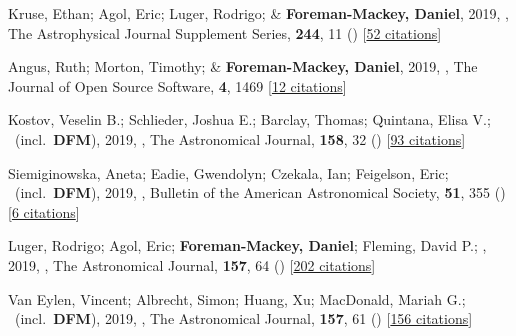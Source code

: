\item[{\color{numcolor}\scriptsize46}] Kruse, Ethan; Agol, Eric; Luger, Rodrigo; \& \textbf{Foreman-Mackey, Daniel}, 2019, , The Astrophysical Journal Supplement Series, \textbf{244}, 11 () [\href{https://ui.adsabs.harvard.edu/abs/2019ApJS..244...11K}{52 citations}]

\item[{\color{numcolor}\scriptsize45}] Angus, Ruth; Morton, Timothy; \& \textbf{Foreman-Mackey, Daniel}, 2019, , The Journal of Open Source Software, \textbf{4}, 1469 [\href{https://ui.adsabs.harvard.edu/abs/2019JOSS....4.1469A}{12 citations}]

\item[{\color{numcolor}\scriptsize44}] Kostov, Veselin B.; Schlieder, Joshua E.; Barclay, Thomas; Quintana, Elisa V.; \etal\ (incl.\ \textbf{DFM}), 2019, , The Astronomical Journal, \textbf{158}, 32 () [\href{https://ui.adsabs.harvard.edu/abs/2019AJ....158...32K}{93 citations}]

\item[{\color{numcolor}\scriptsize43}] Siemiginowska, Aneta; Eadie, Gwendolyn; Czekala, Ian; Feigelson, Eric; \etal\ (incl.\ \textbf{DFM}), 2019, , Bulletin of the American Astronomical Society, \textbf{51}, 355 () [\href{https://ui.adsabs.harvard.edu/abs/2019BAAS...51c.355S}{6 citations}]

\item[{\color{numcolor}\scriptsize42}] Luger, Rodrigo; Agol, Eric; \textbf{Foreman-Mackey, Daniel}; Fleming, David P.; \etal, 2019, , The Astronomical Journal, \textbf{157}, 64 () [\href{https://ui.adsabs.harvard.edu/abs/2019AJ....157...64L}{202 citations}]

\item[{\color{numcolor}\scriptsize41}] Van Eylen, Vincent; Albrecht, Simon; Huang, Xu; MacDonald, Mariah G.; \etal\ (incl.\ \textbf{DFM}), 2019, , The Astronomical Journal, \textbf{157}, 61 () [\href{https://ui.adsabs.harvard.edu/abs/2019AJ....157...61V}{156 citations}]


